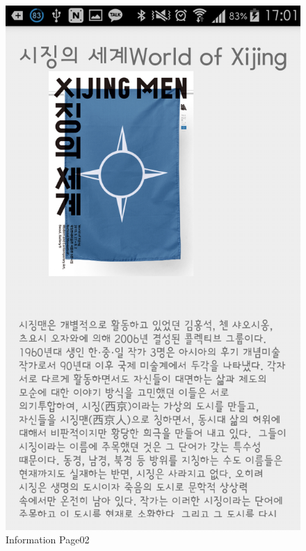 \documentclass[conference]{IEEEtran}
\begin{document}
\begin{figure}[htbp]
\begin{center}
    \includegraphics[scale=0.2]{img_capture08}
    \caption{Information Page02} 
\end{center}
\end{figure}
\end{document}
